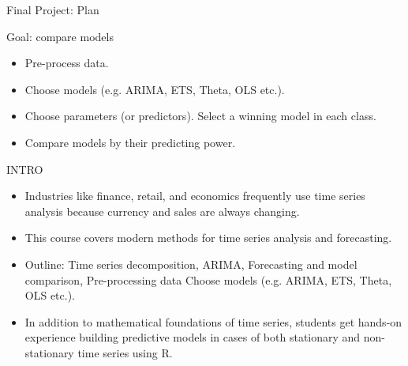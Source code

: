 
\begin{frame} %
	
	
\end{frame}



\begin{frame}{Final Project: Plan}
	
	Goal: compare models  
	
	\begin{itemize}[<+->]
		\item Pre-process data.
		\item Choose models (e.g. ARIMA, ETS, Theta, OLS etc.).
		\item Choose parameters (or predictors). Select a winning model in each class.
		\item Compare models by their predicting power.
	\end{itemize}
	
\end{frame}




\begin{frame} %
	
	
\end{frame}




\begin{frame}{INTRO}
	
	\begin{itemize}
		\item Industries like finance, retail, and economics frequently use time series analysis because currency and sales are always changing.
		\item This course covers modern methods for time series analysis and forecasting. 
		\item Outline: Time series decomposition,
		ARIMA,
		Forecasting and model comparison,
		Pre-processing data Choose models (e.g. ARIMA, ETS, Theta, OLS etc.).
		\item In addition to mathematical foundations of time series, students get hands-on experience building predictive models in cases of both stationary and non-stationary time series using R. 
	\end{itemize}
	
\end{frame}




